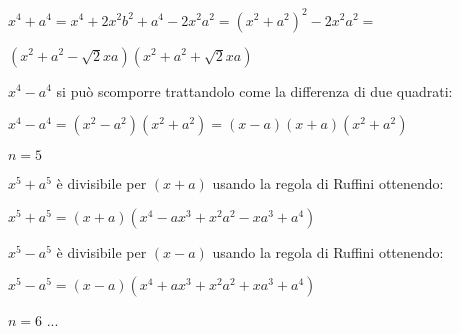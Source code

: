 \begin{itemize*}
\begin{itemize*}
   \(x^4+a^4 = x^4+2x^2b^2+a^4-2x^2a^2 = (x^2+a^2)^2-2x^2a^2=\)
   
   \(\left(x^2+a^2-\sqrt{2}xa\right)\left(x^2+a^2+\sqrt{2}xa\right)\)
   
  \item \(x^4-a^4\) si può scomporre trattandolo come la differenza di due 
   quadrati:
   
   \(x^4-a^4 = (x^2-a^2)(x^2+a^2) = (x-a)(x+a)(x^2+a^2) \)
 \end{itemize*}

 \item \(n=5\)
 \begin{itemize*}
  \item \(x^5+a^5\) è divisibile per \((x+a)\) usando la regola di Ruffini
   ottenendo: 
   
   \(x^5+a^5=(x+a)(x^4-ax^3+x^2a^2-xa^3+a^4)\)
   
  \item \(x^5-a^5\) è divisibile per \((x-a)\) usando la regola di Ruffini
   ottenendo: 
   
   \(x^5-a^5=(x-a)(x^4+ax^3+x^2a^2+xa^3+a^4)\)
   
 \end{itemize*}

 \item \(n=6\) ...
 
\end{itemize*}

%  
% 
% 
% 
%  
% 
% 
% 
% 
% 

